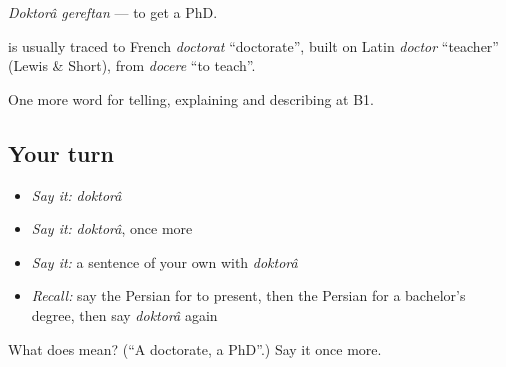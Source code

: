 \emph{Doktorâ gereftan} — to get a PhD.

\begin{cousinweb}
\textbf{} is usually traced to French \emph{doctorat} \textquotedblleft{}doctorate\textquotedblright{}, built on Latin \emph{doctor} \textquotedblleft{}teacher\textquotedblright{} (Lewis \& Short), from \emph{docere} \textquotedblleft{}to teach\textquotedblright{}.
\end{cousinweb}

\begin{grammarlens}[title={What you've built}]
One more word for telling, explaining and describing at B1.
\end{grammarlens}

\subsection*{Your turn}
\begin{itemize}
\raggedright
  \item \emph{Say it:} \emph{doktorâ}
  \item \emph{Say it:} \emph{doktorâ}, once more
  \item \emph{Say it:} a sentence of your own with \emph{doktorâ}
  \item \emph{Recall:} say the Persian for to present, then the Persian for a bachelor's degree, then say \emph{doktorâ} again
\end{itemize}

\begin{tcolorbox}[breakable,colback=teal!4,colframe=teal!35!black,title={Before you move on}]
What does  mean? (\textquotedblleft{}A doctorate, a PhD\textquotedblright{}.) Say it once more.
\end{tcolorbox}

